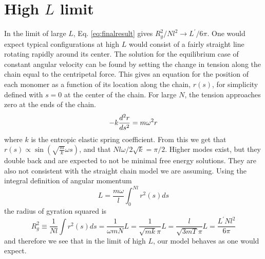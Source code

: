 \documentclass[pre,showpacs]{revtex4}
\begin{document}
\section{High $L$ limit}
In the limit of large $L$, Eq. \ref{eq:finalresult} gives $R_g^2/Nl^2 \to L^\prime/6\pi$. One would expect typical configurations at high $L$ would consist of a fairly straight line rotating rapidly around its center. The solution for the equilibrium case of constant angular velocity can be found by setting the change in tension along the chain equal to the centripetal force. This gives an equation for the position of each monomer as a function of its location along the chain, $r(s)$, for simplicity defined with $s=0$ at the center of the chain. For large $N$, the tension approaches zero at the ends of the chain.
\begin{equation}
-k\frac{d^2r}{ds^2} = m \omega^2 r \\
\end{equation}
where $k$ is the entropic elastic spring coefficient.
From this we get that $r(s) \propto \sin(\sqrt{\frac{m}{k}}\omega s)$, and that $Nl\omega/2\sqrt{k} = \pi/2$. Higher modes exist, but they double back and are expected to not be minimal free energy solutions. They are also not consistent with the straight chain model we are assuming. Using the integral definition of angular momentum
\begin{equation}
L = \frac{m \omega}{l}\int_0^{Nl}  r^2(s)ds 
\end{equation}
the radius of gyration squared is
\begin{equation}
R_g^2 \equiv \frac{1}{Nl}\int r^2(s)ds = \frac{1}{\omega m N } L = \frac{1}{\sqrt{mk}\pi}L = \frac{l}{\sqrt{3mT}\pi}L = \frac{L^\prime Nl^2}{6\pi}
\end{equation}
and therefore we see that in the limit of high $L$, our model behaves as one would expect.
\end{document}
